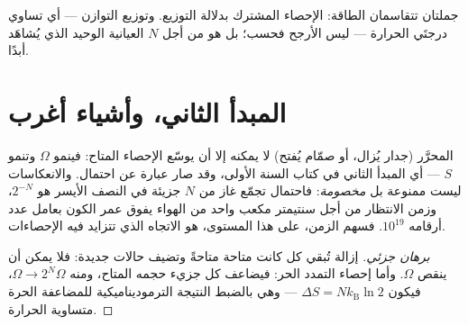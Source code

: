 \begin{omfigure}

{\small جملتان تتقاسمان الطاقة: الإحصاء المشترك بدلالة
التوزيع. وتوزيع التوازن --- أي تساوي درجتَي الحرارة --- ليس
الأرجح فحسب؛ بل هو من أجل $N$ العيانية الوحيد الذي يُشاهَد أبدًا.}
\end{omfigure}

\section{المبدأ الثاني، وأشياء أغرب}

\begin{proposition}\label{prop:b3:microcanonical-ensemble:second-law}
 المحرَّر (جدار يُزال، أو صمّام يُفتح) لا يمكنه إلا أن
يوسّع الإحصاء المتاح: فينمو $\Omega$ وتنمو $S$ --- أي المبدأ
الثاني في كتاب السنة الأولى، وقد صار عبارة عن
احتمال. والانعكاسات ليست ممنوعة بل \emph{مخصومة}: فاحتمال
تجمّع غاز من $N$ جزيئة في النصف الأيسر هو
$2^{-N}$، وزمن الانتظار من أجل سنتيمتر مكعب واحد من الهواء
يفوق عمر الكون بعامل عدد أرقامه $10^{19}$.
فسهم الزمن، على هذا المستوى، هو الاتجاه الذي تتزايد فيه
الإحصاءات.
\end{proposition}

\begin{proof}[برهان جزئي]
إزالة  تُبقي كل  كانت متاحة
متاحةً وتضيف حالات جديدة: فلا يمكن أن ينقص $\Omega$. وأما
إحصاء التمدد الحر: فيضاعف كل جزيء حجمه المتاح، ومنه
$\Omega \to 2^N\Omega$، فيكون $\Delta S = Nk_{\text{B}}\ln2$ ---
وهي بالضبط النتيجة الترموديناميكية للمضاعفة الحرة متساوية الحرارة.
\end{proof}

